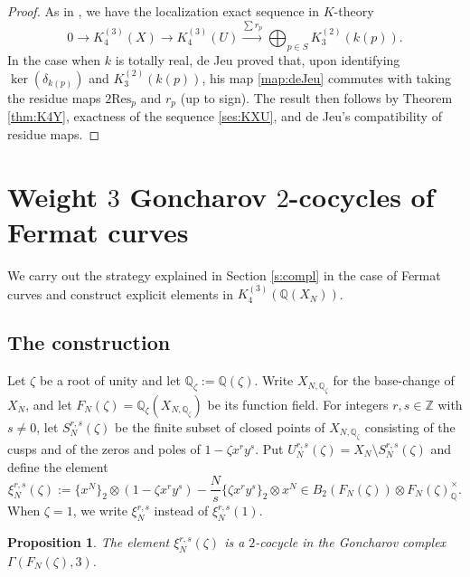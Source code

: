\documentclass[11pt,a4,leqno]{amsart}
\theoremstyle{my theoremstyle}
\newtheorem{prop}[thm]{Proposition}
\theoremstyle{dfn}
\theoremstyle{remark}
\renewcommand{\1}{\mathbbm{1}}
\newcommand{\Z}{\mathbb{Z}}
\newcommand{\Q}{\mathbb{Q}}
\newcommand{\z}{\zeta}
\numberwithin{equation}{section}
\begin{document}
\begin{proof}
    As in \cite[(29)]{Bru20}, we have the localization exact sequence in $K$-theory
\begin{equation}\label{ses:KXU}
    0 \longrightarrow K_4^{(3)}(X) \longrightarrow K_4^{(3)}(U) \overset{\sum r_p}{\longrightarrow} \bigoplus_{p\in S} K_3^{(2)}(k(p)).
\end{equation}
In the case when $k$ is totally real, de Jeu proved that, upon identifying $\ker(\delta_{k(p)})$ and $K_3^{(2)}(k(p))$, his map \eqref{map:deJeu} commutes with taking the residue maps $2\mathrm{Res}_p$ and $r_p$ \cite[Theorem 4.4]{Bru20} (up to sign).
The result then follows by Theorem \ref{thm:K4Y}, exactness of the sequence \eqref{ses:KXU}, and de Jeu's compatibility of residue maps.
\end{proof}
 

\section{Weight $3$ Goncharov $2$-cocycles of Fermat curves}\label{s:2coc}

We carry out the strategy explained in Section \ref{s:compl} in the case of Fermat curves and construct explicit elements in $K_4^{(3)}(\Q(X_N))$.

\subsection{The construction}
Let $\z$ be a root of unity and let $\Q_{\z}:=\Q(\z)$. Write $X_{N,\Q_\z}$ for the base-change of $X_N$, and let $F_N(\z)=\Q_{\z}(X_{N,\Q_{\zeta}})$ be its function field.
For integers $r, s\in \Z$ with $s\neq 0$, let $S_N^{r,s}(\z)$ be the finite subset of closed points of $X_{N,\Q_{\zeta}}$ consisting of the cusps and of the zeros and poles of $1- \z x^ry^s$. 
Put $U_N^{r,s}(\z)=X_N \setminus S_N^{r,s}(\z)$ and define the element 
\[
\xi_N^{r,s}(\z):=\{x^N\}_2 \otimes (1- \z x^r y^s) - \frac{N}{s} \{\z x^r y^s\}_2 \otimes x^N\in B_2(F_N(\z))\otimes F_N(\z)^\times_{\Q}.
\]
When $\zeta=1$, we write $\xi^{r, s}_N$ instead of $\xi^{r, s}_N(1)$.

\begin{prop}
    The element $\xi_N^{r,s}(\z)$ is a $2$-cocycle in the Goncharov complex $\Gamma(F_N(\z), 3)$. 
\end{prop}
\end{document}
